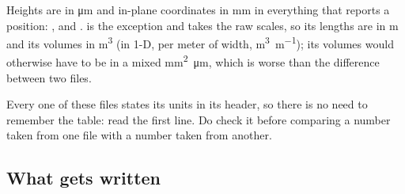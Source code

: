 \begin{warn}
  Heights are in \si{\micro\metre} and in-plane coordinates in
  \si{\milli\metre} in everything that reports a position: ,
   and .  is the
  exception and takes the raw scales, so its lengths are in \si{\metre} and
  its volumes in \si{\metre\cubed} (in 1-D, per meter of width,
  \si{\metre\cubed\per\metre}); its volumes would otherwise have to be
  in a mixed \si{\milli\metre\squared\micro\metre}, which is worse than the
  difference between two files.

  Every one of these files states its units in its header, so there is no need
  to remember the table: read the first line. Do check it before comparing a
  number taken from one file with a number taken from another.
\end{warn}

\subsection{What gets written}

